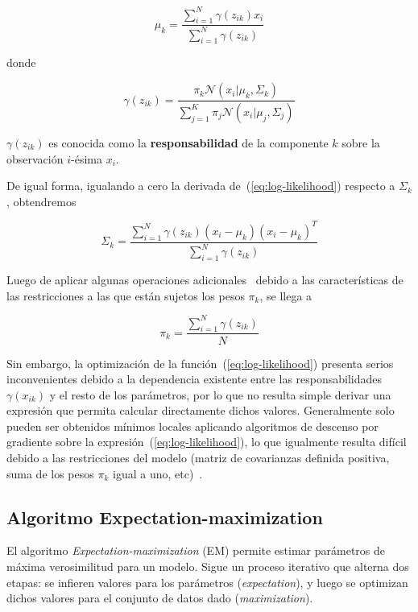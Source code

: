 \begin{equation}
    \label{eq:mu_k}
    \mu_k = \frac{\sum_{i=1}^{N}{\gamma(z_{ik})x_i}}{\sum_{i=1}^{N}{\gamma(z_{ik})}}
\end{equation}

\noindent
donde

\begin{equation}
    \label{eq:gamma}
    \gamma(z_{ik}) = \frac{\pi_k \mathcal{N}(x_i|\mu_k,\Sigma_k)}{\sum_{j=1}^{K}{\pi_j \mathcal{N}(x_i|\mu_j,\Sigma_j)}}
\end{equation}

$\gamma(z_{ik})$ es conocida como la \textbf{responsabilidad} de la componente $k$ sobre la observación $i$-ésima $x_i$.

De igual forma, igualando a cero la derivada de~(\ref{eq:log-likelihood}) respecto a $\Sigma_k$, obtendremos

\begin{equation}
    \label{eq:Sigma_k}
    \Sigma_k = \frac{\sum_{i=1}^{N}{\gamma(z_{ik})(x_i-\mu_k)(x_i-\mu_k)^T}}{\sum_{i=1}^{N}{\gamma(z_{ik})}}
\end{equation}

Luego de aplicar algunas operaciones adicionales~\cite{Aggarawal13} debido a las características de las restricciones a las que están sujetos los pesos $\pi_k$, se llega a

\begin{equation}
    \label{eq:pi_k}
    \pi_k = \frac{\sum_{i=1}^{N}{\gamma(z_{ik})}}{N}
\end{equation}

Sin embargo, la optimización de la función~(\ref{eq:log-likelihood}) presenta serios inconvenientes debido a la dependencia existente entre las responsabilidades $\gamma(x_{ik})$ y el resto de los parámetros, por lo que no resulta simple derivar una expresión que permita calcular directamente dichos valores.
Generalmente solo pueden ser obtenidos mínimos locales aplicando algoritmos de descenso por gradiente sobre la expresión~(\ref{eq:log-likelihood}), lo que igualmente resulta difícil debido a las restricciones del modelo (matriz de covarianzas definida positiva, suma de los pesos $\pi_k$ igual a uno, etc)~\cite{Aggarawal13,Murphy12}.

\subsection{Algoritmo Expectation-maximization}\label{subsec:EM}

El algoritmo \textit{Expectation-maximization} (EM) permite estimar parámetros de máxima verosimilitud para un modelo.
Sigue un proceso iterativo que alterna dos etapas: se infieren valores para los parámetros (\textit{expectation}), y luego se optimizan dichos valores para el conjunto de datos dado (\textit{maximization}).

